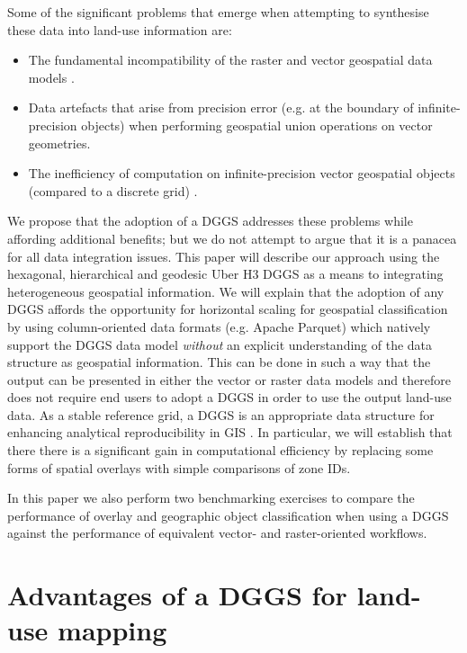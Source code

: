 \documentclass[]{interact}
\theoremstyle{plain}%
\theoremstyle{definition}
\theoremstyle{remark}
\begin{document}
Some of the significant problems that emerge when attempting to synthesise these data into land-use information are:

\begin{itemize}
    \item The fundamental incompatibility of the raster and vector geospatial data models \citep{piwowar1990integration,goodchild1994integrating}.
    \item Data artefacts that arise from precision error (e.g. at the boundary of infinite-precision objects) when performing geospatial union operations on vector geometries. \citep{schneider2003design,veregin1989error}
    \item The inefficiency of computation on infinite-precision vector geospatial objects (compared to a discrete grid) \citep{hojati2022giscience}.
\end{itemize}

We propose that the adoption of a \acf{DGGS} addresses these problems while affording additional benefits; but we do not attempt to argue that it is a panacea for all data integration issues. This paper will describe our approach using the hexagonal, hierarchical and geodesic Uber H3 \ac{DGGS} \citep{brodsky2018h3} as a means to integrating heterogeneous geospatial information. We will explain that the adoption of any \ac{DGGS} affords the opportunity for horizontal scaling for geospatial classification by using column-oriented data formats (e.g. Apache Parquet) which natively support the \ac{DGGS} data model \textit{without} an explicit understanding of the data structure as geospatial information. This can be done in such a way that the output can be presented in either the vector or raster data models and therefore does not require end users to adopt a \ac{DGGS} in order to use the output land-use data. As a stable reference grid, a \ac{DGGS} is an appropriate data structure for enhancing analytical reproducibility in \ac{GIS} \citep{purss2019datacubes,etherington2022}. In particular, we will establish that there there is a significant gain in computational efficiency by replacing some forms of spatial overlays with simple comparisons of zone IDs.

In this paper we also perform two benchmarking exercises to compare the performance of overlay and geographic object classification when using a \ac{DGGS} against the performance of equivalent vector- and raster-oriented workflows.

\section{Advantages of a \ac{DGGS} for land-use mapping} %
\end{document}
